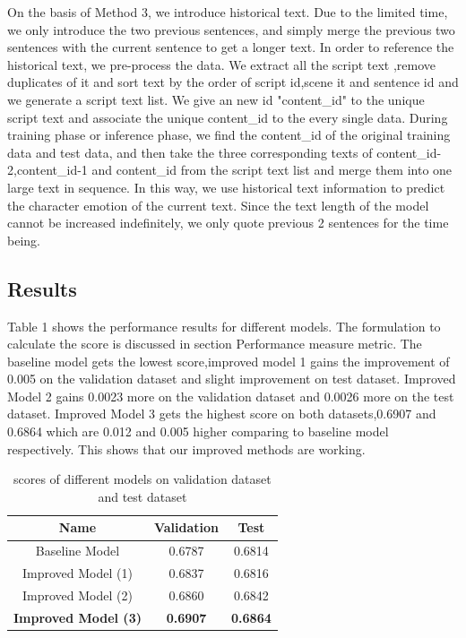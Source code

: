 \documentclass[12pt,twocolumn,letterpaper]{article}
\begin{document}
On the basis of Method 3, we introduce historical text. Due to the limited time, we only introduce the two previous sentences, and simply merge the previous two sentences with the current sentence to get a longer text. In order to reference the historical text, we pre-process the data. We extract all the script text ,remove duplicates of it and sort text by the order of script id,scene it and sentence id and we generate a script text list. We give an new id "content\_id" to the unique script text and associate the unique content\_id to the every single data. During training phase or inference phase, we find the content\_id of the original training data and test data, and then take the three corresponding texts of content\_id-2,content\_id-1 and content_id from the script text list and merge them into one large text in sequence. 
In this way, we use historical text information to predict the character emotion of the current text. Since the text length of the model cannot be increased indefinitely, we only quote previous 2 sentences for the time being. 



\subsection{Results}
Table 1 shows the performance results for different models. The formulation to calculate the score is discussed in section Performance measure metric. The baseline model gets the lowest score,improved model 1 gains the improvement of  0.005 on the validation dataset and slight improvement on test dataset. Improved Model 2 gains 0.0023 more on the validation dataset and 0.0026 more on the test dataset. Improved Model 3 gets the highest score on both datasets,0.6907 and 0.6864 which are 0.012 and 0.005 higher comparing to baseline model respectively. This shows that our improved methods are working. 

\begin{table}
\begin{center}
\begin{tabular}{|c|c|c|}
\hline
Name & Validation  & Test\\
\hline 
Baseline Model & 0.6787 & 0.6814\\
\hline 
Improved Model (1) & 0.6837 & 0.6816\\
\hline 
Improved Model (2) & 0.6860 & 0.6842\\
\hline 
\bf Improved Model (3) & \bf 0.6907 & \bf 0.6864\\
\hline 
\end{tabular}
\end{center}
\caption{scores of different models on validation dataset and test dataset}
\end{table}
\end{document}
